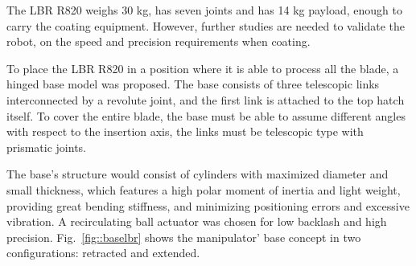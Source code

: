 

The LBR R820 weighs 30 kg, has seven joints and has 14 kg payload, enough to
carry the coating equipment. However, further studies are needed to validate
the robot, on the speed and precision requirements when coating.


To place the LBR R820 in a position where it is able to process all the
blade, a hinged base model was proposed. The base consists of three telescopic
links interconnected by a revolute joint, and the first link is attached to the
top hatch itself. To cover the entire blade, the base must be able to assume different angles with
respect to the insertion axis, the links must be telescopic type with
prismatic joints.  

The base's structure would consist of cylinders with maximized diameter and
small thickness, which features a high polar moment of inertia and light weight,
providing great bending stiffness, and minimizing positioning errors and
excessive vibration. A recirculating ball actuator was chosen for low
backlash and high precision. Fig.~\ref{fig::baselbr} shows the manipulator'
base concept in two configurations: retracted and extended.



